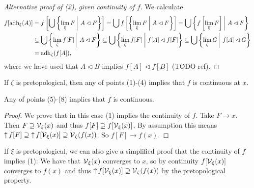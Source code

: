 \begin{proof}[Alternative proof of (2), given continuity of $f$]
We calculate
\begin{align*}
f[\adh_\xi(A)] &= f\left[\bigcup \setbuilder{\lim_\xi F}{A \lhd F} \right] = \bigcup f\left[ \setbuilder{\lim_\xi F}{A \lhd F} \right] = \bigcup \setbuilder{f\left[\lim_\xi F\right]}{A \lhd F} \\
&\subseteq \bigcup \setbuilder{\lim_\zeta f[F]}{A \lhd F} \subseteq \bigcup \setbuilder{\lim_\zeta f[F]}{f[A] \lhd f[F]} \subseteq \bigcup \setbuilder{\lim_\zeta G}{f[A] \lhd G} \\
&= \adh_\zeta(f[A]),
\end{align*}
where we have used that $A \lhd B$ implies $f[A] \lhd f[B]$ (TODO ref).
\end{proof}
\begin{corollary} \label{pretopologicalContinuityVicinities}
If $\zeta$ is pretopological, then any of points (1)-(4) implies that $f$ is continuous at $x$.

Any of points (5)-(8) implies that $f$ is continuous.
\end{corollary}
\begin{proof}
We prove that in this case (1) implies the continuity of $f$. Take $F\to x$. Then $F\supseteq \operatorname{\mathcal{V}}_\xi(x)$ and thus $f[F]\supseteq f[\operatorname{\mathcal{V}}_\xi(x)]$. By assumption this means $\operatorname{\uparrow} f[F]\supseteq \operatorname{\uparrow} f[\operatorname{\mathcal{V}}_\xi(x)]\supseteq \operatorname{\mathcal{V}}_\zeta(f(x))$. So $f[F]\to f(x)$.
\end{proof}

If $\xi$ is pretopological, we can also give a simplified proof that the continuity of $f$ implies (1): We have that $\operatorname{\mathcal{V}}_\xi(x)$ converges to $x$, so by continuity $f[\operatorname{\mathcal{V}}_\xi(x)]$ converges to $f(x)$ and thus $\operatorname{\uparrow} f[\operatorname{\mathcal{V}}_\xi(x)] \supseteq \operatorname{\mathcal{V}}_\zeta(f(x))$ by the pretopological property.

